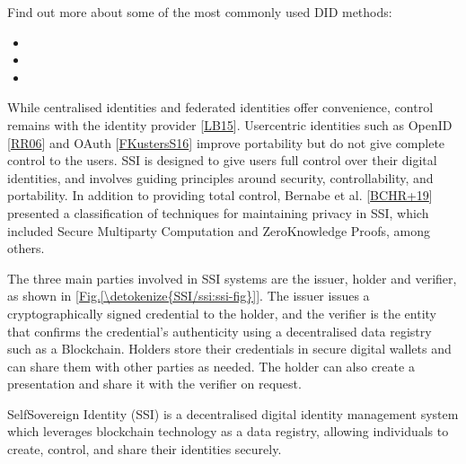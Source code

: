 \documentclass[letterpaper,10pt,english]{jupyterBook}
\begin{document}
\nopagebreak


\sphinxAtStartPar
Find out more about some of the most commonly used DID methods:
\begin{itemize}
\item {} 
\sphinxAtStartPar
{}

\item {} 
\sphinxAtStartPar
{}

\item {} 
\sphinxAtStartPar
{}

\end{itemize}



\sphinxAtStartPar
While centralised identities and federated identities offer convenience, control remains with the identity provider {[}\hyperlink{cite.SSI/ssi:id49}{LB15}{]}. User\sphinxhyphen{}centric identities such as OpenID {[}\hyperlink{cite.SSI/ssi:id50}{RR06}{]} and OAuth {[}\hyperlink{cite.SSI/ssi:id51}{FKustersS16}{]} improve portability but do not give complete control to the users. SSI is designed to give users full control over their digital identities, and involves guiding principles around security, controllability, and portability. In addition to providing total control, Bernabe et al. {[}\hyperlink{cite.SSI/ssi:id52}{BCHR+19}{]} presented a classification of techniques for maintaining privacy in SSI, which included Secure Multiparty Computation and Zero\sphinxhyphen{}Knowledge Proofs, among others.

\sphinxAtStartPar
The three main parties involved in SSI systems are the issuer, holder and verifier, as shown in {[}\hyperref[\detokenize{SSI/ssi:ssi-fig}]{Fig.\@ \ref{\detokenize{SSI/ssi:ssi-fig}}}{]}. The issuer issues a cryptographically signed credential to the holder, and the verifier is the entity that confirms the credential’s authenticity using a decentralised data registry such as a Blockchain. Holders store their credentials in secure digital wallets and can share them with other parties as needed. The holder can also create a presentation and share it with the verifier on request.

\begin{sphinxShadowBox}

\sphinxAtStartPar
Self\sphinxhyphen{}Sovereign Identity (SSI) is a decentralised digital identity management system which leverages blockchain technology as a data registry, allowing individuals to create, control, and share their identities securely.
\end{sphinxShadowBox}
\end{document}
